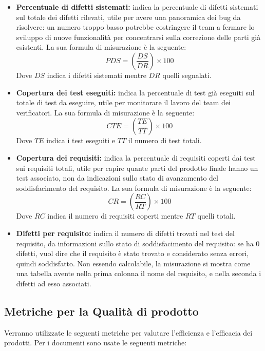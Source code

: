 \begin{itemize}
    \item \textbf{Percentuale  di  difetti  sistemati:} indica  la  percentuale  di difetti sistemati sul totale dei difetti rilevati, utile per avere una panoramica dei bug da risolvere:  un numero troppo basso potrebbe costringere il team a fermare lo sviluppo di nuove funzionalità per concentrarsi sulla correzione delle parti già esistenti.  La sua formula di misurazione è la seguente:\newline
    \[
		PDS=(\frac{DS}{DR}) \times 100
	\]	
	Dove $DS$ indica i difetti sistemati mentre $DR$ quelli segnalati.
    \item \textbf{Copertura dei test eseguiti:} indica la percentuale di test già eseguiti sul totale di test da eseguire, utile per monitorare il lavoro del team dei verificatori.  La sua formula di misurazione è la seguente:\newline
    \[
		CTE=(\frac{TE}{TT}) \times 100
	\]	
	Dove $TE$ indica i test eseguiti e $TT$ il numero di test totali.
    \item \textbf{Copertura  dei  requisiti:} indica  la  percentuale  di  requisiti coperti dai test sui requisiti totali, utile per capire quante parti del prodotto finale hanno un test associato, non da indicazioni sullo stato di avanzamento  del  soddisfacimento  del  requisito.   La  sua  formula  di  misurazione  è la seguente:\newline
    \[
		CR=(\frac{RC}{RT}) \times 100
	\]	
	Dove $RC$ indica il numero di requisiti coperti mentre $RT$ quelli totali.
    \item \textbf{Difetti per requisito:} indica il numero di difetti trovati nel test del requisito, da informazioni sullo stato di soddisfacimento del requisito: se ha 0 difetti, vuol dire che il requisito è stato trovato e considerato senza errori, quindi soddisfatto.  Non essendo calcolabile, la misurazione si mostra come una tabella avente nella prima colonna il nome del requisito,  e nella seconda i difetti ad esso associati.
\end{itemize}

\subsection{Metriche per la Qualità di prodotto}
		Verranno  utilizzate  le  seguenti  metriche  per  valutare  l’efficienza  e  l’efficacia  dei prodotti. \newline Per i documenti sono usate le seguenti metriche:
